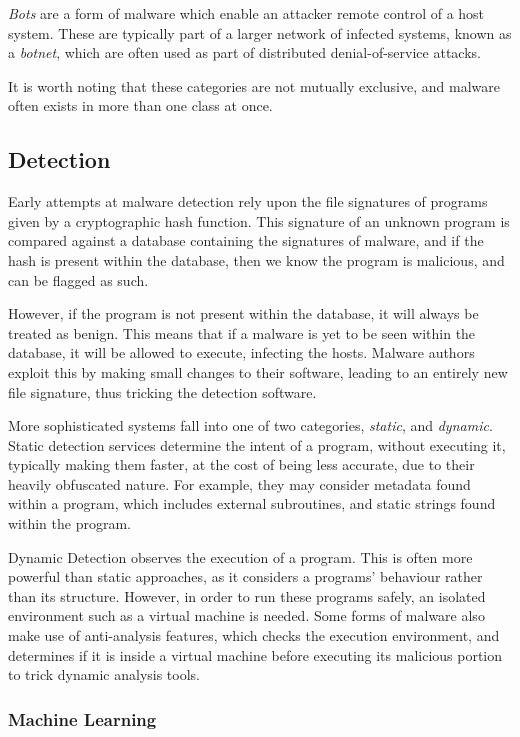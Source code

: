 \documentclass[twocolumn]{article}
\begin{document}
\emph{Bots} are a form of malware which enable an attacker remote control of a host system. These are typically part of a larger network of infected systems, known as a \emph{botnet}, which are often used as part of distributed denial-of-service attacks. 

It is worth noting that these categories are not mutually exclusive, and malware often exists in more than one class at once. 

\subsection{Detection}

Early attempts at malware detection rely upon the file signatures of programs given by a cryptographic hash function. This signature of an unknown program is compared against a database containing the signatures of malware, and if the hash is present within the database, then we know the program is malicious, and can be flagged as such. 

However, if the program is not present within the database, it will always be treated as benign.  This means that if a malware is yet to be seen within the database, it will be allowed to execute, infecting the hosts. Malware authors exploit this by making small changes to their software, leading to an entirely new file signature, thus tricking the detection software. 

More sophisticated systems fall into one of two categories, \emph{static}, and \emph{dynamic}. Static detection services determine the intent of a program, without executing it, typically making them faster, at the cost of being less accurate, due to their heavily obfuscated nature. For example, they may consider metadata found within a program, which includes external subroutines, and static strings found within the program. 

Dynamic Detection observes the execution of a program. This is often more powerful than static approaches, as it considers a programs' behaviour rather than its structure. However, in order to run these programs safely, an isolated environment such as a virtual machine is needed. Some forms of malware also make use of anti-analysis features, which checks the execution environment, and determines if it is inside a virtual machine before executing its malicious portion to trick dynamic analysis tools.  

\subsubsection{Machine Learning}
\end{document}

